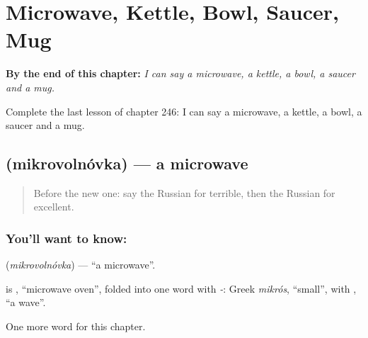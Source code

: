 
\chapter{Microwave, Kettle, Bowl, Saucer, Mug}
\label{ch:ru-microwave-kettle-bowl-saucer-mug}

\begin{chapteropening}
\textbf{By the end of this chapter:} \emph{I can say a microwave, a kettle, a bowl, a saucer and a mug.}

Complete the last lesson of chapter 246: I can say a microwave, a kettle, a bowl, a saucer and a mug.
\end{chapteropening}

\section[\texorpdfstring{\ru{микроволновка} (mikrovolnóvka)}{микроволновка (mikrovolnóvka)}]{ (mikrovolnóvka) — a microwave}

\label{lesson:RU-C246-mikrovolnovka}



\begin{quote}
Before the new one: say the Russian for terrible, then the Russian for excellent.
\end{quote}

\subsection*{You'll want to know: }
\textbf{} (\emph{mikrovolnóvka}) — \textquotedblleft{}a microwave\textquotedblright{}.

\begin{cousinweb}
\textbf{} is \emph{ }, \textquotedblleft{}microwave oven\textquotedblright{}, folded into one word with \emph{-}: Greek \emph{mikrós}, \textquotedblleft{}small\textquotedblright{}, with \emph{}, \textquotedblleft{}a wave\textquotedblright{}.
\end{cousinweb}

\begin{grammarlens}[title={What you've built}]
One more word for this chapter.
\end{grammarlens}

